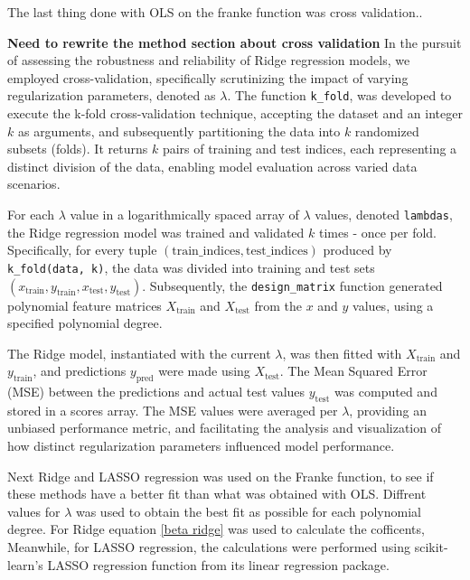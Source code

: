 \noindent The last thing done with OLS on the franke function was cross validation.. 

\textbf{Need to rewrite the method section about cross validation}
In the pursuit of assessing the robustness and reliability of Ridge regression models, we employed cross-validation, specifically scrutinizing the impact of varying regularization parameters, denoted as \(\lambda\). The function \texttt{k\_fold}, was developed to execute the k-fold cross-validation technique, accepting the dataset and an integer \(k\) as arguments, and subsequently partitioning the data into \(k\) randomized subsets (folds). It returns \(k\) pairs of training and test indices, each representing a distinct division of the data, enabling model evaluation across varied data scenarios.

For each \(\lambda\) value in a logarithmically spaced array of \(\lambda\) values, denoted \texttt{lambdas}, the Ridge regression model was trained and validated \(k\) times - once per fold. Specifically, for every tuple \((\text{train\_indices}, \text{test\_indices})\) produced by \texttt{k\_fold(data, k)}, the data was divided into training and test sets \((x_{\text{train}}, y_{\text{train}}, x_{\text{test}}, y_{\text{test}})\).
Subsequently, the \texttt{design\_matrix} function generated polynomial feature matrices \(X_{\text{train}}\) and \(X_{\text{test}}\) from the \(x\) and \(y\) values, using a specified polynomial degree. 

The Ridge model, instantiated with the current \(\lambda\), was then fitted with \(X_{\text{train}}\) and \(y_{\text{train}}\), and predictions \(y_{\text{pred}}\) were made using \(X_{\text{test}}\). The Mean Squared Error (MSE) between the predictions and actual test values \(y_{\text{test}}\) was computed and stored in a scores array.
The MSE values were averaged per \(\lambda\), providing an unbiased performance metric, and facilitating the analysis and visualization of how distinct regularization parameters influenced model performance.


\noindent Next Ridge and LASSO regression was used on the Franke function,
to see if these methods have a better fit than what was obtained with OLS.
Diffrent values for $\lambda$ was used to obtain the best fit as possible for each
polynomial degree. For Ridge equation \eqref{beta ridge} was used to calculate
the cofficents, Meanwhile, for LASSO regression, the calculations were performed using 
scikit-learn's LASSO regression function from its linear regression package.


